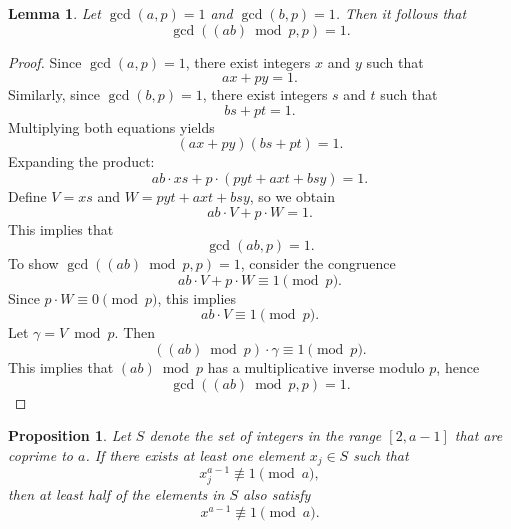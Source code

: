 \documentclass[12pt,a4paper]{report}
\newtheorem{lemma}{Lemma}[chapter]
\newtheorem{proposition}{Proposition}[chapter]
\begin{document}
\begin{lemma}
Let \(\gcd(a,p)=1\) and \(\gcd(b,p)=1\). Then it follows that
\[
\gcd((ab)\bmod p,p)=1.
\]
\end{lemma}

\begin{proof}
Since \(\gcd(a,p)=1\), there exist integers \(x\) and \(y\) such that
\[
ax+py=1.
\]
Similarly, since \(\gcd(b,p)=1\), there exist integers \(s\) and \(t\) such that
\[
bs+pt=1.
\]
Multiplying both equations yields
\[
(ax+py)(bs+pt)=1.
\]
Expanding the product:
\[
ab\cdot xs+p\cdot (pyt+axt+bsy)=1.
\]
Define \(V=xs\) and \(W=pyt+axt+bsy\), so we obtain
\[
ab\cdot V+p\cdot W=1.
\]
This implies that
\[
\gcd(ab,p)=1.
\]
To show \(\gcd((ab)\bmod p,p)=1\), consider the congruence
\[
ab\cdot V+p\cdot W\equiv 1 \pmod p.
\]
Since \(p\cdot W\equiv 0 \pmod p\), this implies
\[
ab\cdot V\equiv 1 \pmod p.
\]
Let \(\gamma =V\bmod p\). Then
\[
((ab)\bmod p)\cdot \gamma \equiv 1 \pmod p.
\]
This implies that \((ab)\bmod p\) has a multiplicative inverse modulo \(p\), hence
\[
\gcd((ab)\bmod p,p)=1.
\]
\end{proof}

\begin{proposition}
Let \(S\) denote the set of integers in the range \([2,a-1]\) that are coprime to \(a\). If there exists at least one element \(x_j\in S\) such that
\[
x_j^{a-1}\not\equiv 1 \pmod{a},
\]
then at least half of the elements in \(S\) also satisfy
\[
x^{a-1}\not\equiv 1 \pmod{a}.
\]
\end{proposition}
\end{document}
